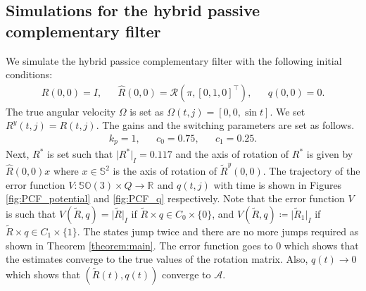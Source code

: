 \documentclass{article}
\newcommand{\SOthree}{\mathbb{SO}(3)}
\newcommand{\R}[1]{\mathbb{R}^{#1}}
\newcommand{\Rtilde}{\tilde{R}}
\newcommand{\normSOthree}[1]{{{\vert}#1 {\vert}_I}}
\newcommand{\A}{\mathcal{A}}
\newcommand{\Rstar}{{R^*}}
\begin{document}
\subsection{Simulations for the hybrid passive complementary filter}
We simulate the hybrid passice complementary filter with the following initial conditions: 
\begin{align*}
    R(0, 0) = I, && \hat{R}(0,0) = \mathcal{R}(\pi, [0,1,0]^\top ), && q(0,0) = 0.
\end{align*}
The true angular velocity $\Omega$ is set as $\Omega(t,j) = [0,0,\sin{t}]$. We set $R^y(t,j) = R(t,j)$. The gains and the switching parameters are set as follows.
\begin{align*}
    k_p = 1, && c_0 = 0.75, && c_1 = 0.25.
\end{align*}
Next, $\Rstar$ is set such that $\normSOthree{\Rstar}=0.117$ and the axis of rotation of $\Rstar$ is given by $\hat{R}(0,0)x$ where $x\in\mathbb{S}^2$ is the axis of rotation of $\Rtilde^y(0,0)$. The trajectory of the error function $V : \SOthree \times Q\to \R{}$ and $q(t,j)$ with time is shown in Figures \ref{fig:PCF_potential} and \ref{fig:PCF_q} respectively. Note that the error function $V$ is such that $V(\Rtilde, q) = \normSOthree{\Rtilde}$ if $\Rtilde\times q\in C_0\times \{0\}$, and $V(\Rtilde, q)\coloneqq \normSOthree{\Rtilde_1}$ if $\Rtilde\times q\in C_1\times\{1\}$.  The states jump twice and there are no more jumps required as shown in Theorem \ref{theorem:main}. The error function goes to $0$ which shows that the estimates converge to the true values of the rotation matrix. Also, $q(t)\to 0$ which shows that $(\Rtilde(t), q(t))$ converge to $\A$. 
\end{document}
